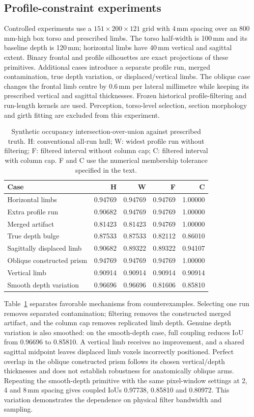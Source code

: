 \documentclass[11pt,a4paper]{article}
\begin{document}
\subsection{Profile-constraint experiments}
Controlled experiments use a $151\times200\times121$ grid with 4\,mm spacing over an 800\,mm-high box torso and prescribed limbs. The torso half-width is 100\,mm and its baseline depth is 120\,mm; horizontal limbs have 40\,mm vertical and sagittal extent. Binary frontal and profile silhouettes are exact projections of these primitives. Additional cases introduce a separate profile run, merged contamination, true depth variation, or displaced/vertical limbs. The oblique case changes the frontal limb centre by 0.6\,mm per lateral millimetre while keeping its prescribed vertical and sagittal thicknesses. Frozen historical profile-filtering and run-length kernels are used. Perception, torso-level selection, section morphology and girth fitting are excluded from this experiment.

\begin{table}[htbp]
\centering
\caption{Synthetic occupancy intersection-over-union against prescribed truth. H: conventional all-run hull; W: widest profile run without filtering; F: filtered interval without column cap; C: filtered interval with column cap. F and C use the numerical membership tolerance specified in the text.}
\label{tab:synthetic}
\small
\begin{tabular}{lrrrr}
\toprule
Case & H & W & F & C\\
\midrule
Horizontal limbs &0.94769&0.94769&0.94769&1.00000\\
Extra profile run &0.90682&0.94769&0.94769&1.00000\\
Merged artifact &0.81423&0.81423&0.94769&1.00000\\
True depth bulge &0.87533&0.87533&0.82112&0.86010\\
Sagittally displaced limb &0.90682&0.89322&0.89322&0.94107\\
Oblique constructed prism &0.94769&0.94769&0.94769&1.00000\\
Vertical limb &0.90914&0.90914&0.90914&0.90914\\
Smooth depth variation &0.96696&0.96696&0.81606&0.85810\\
\bottomrule
\end{tabular}
\end{table}

Table~\ref{tab:synthetic} separates favorable mechanisms from counterexamples. Selecting one run removes separated contamination; filtering removes the constructed merged artifact, and the column cap removes replicated limb depth. Genuine depth variation is also smoothed: on the smooth-depth case, full coupling reduces IoU from 0.96696 to 0.85810. A vertical limb receives no improvement, and a shared sagittal midpoint leaves displaced limb voxels incorrectly positioned. Perfect overlap in the oblique constructed prism follows its chosen vertical/depth thicknesses and does not establish robustness for anatomically oblique arms. Repeating the smooth-depth primitive with the same pixel-window settings at 2, 4 and 8\,mm spacing gives coupled IoUs 0.97738, 0.85810 and 0.80972. This variation demonstrates the dependence on physical filter bandwidth and sampling.
\end{document}
